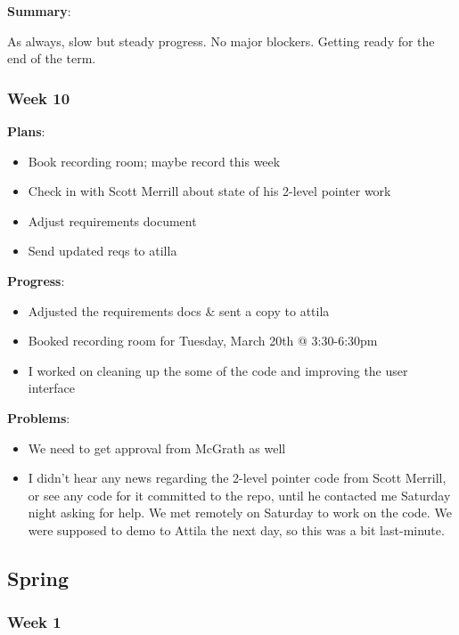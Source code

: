 \noindent \textbf{Summary}:

As always, slow but steady progress. No major blockers. Getting ready for the end of the term. 



\subsubsection{Week 10}

\noindent \textbf{Plans}:
\begin{itemize}
\item Book recording room; maybe record this week 
\item Check in with Scott Merrill about state of his 2-level pointer work 
\item Adjust requirements document 
\item Send updated reqs to atilla 
\end{itemize}

\noindent \textbf{Progress}:

\begin{itemize}
\item Adjusted the requirements docs \& sent a copy to attila 
\item Booked recording room for Tuesday, March 20th @ 3:30-6:30pm 
\item I worked on cleaning up the some of the code and improving the user interface  
\end{itemize}

\noindent \textbf{Problems}:

\begin{itemize}
\item We need to get approval from McGrath as well 
\item I didn't hear any news regarding the 2-level pointer code from Scott Merrill, or see any code for it committed to the repo, until he contacted me Saturday night asking for help. We met remotely on Saturday to work on the code. We were supposed to demo to Attila the next day, so this was a bit last-minute.
\end{itemize}

\subsection{Spring}
\subsubsection{Week 1}

